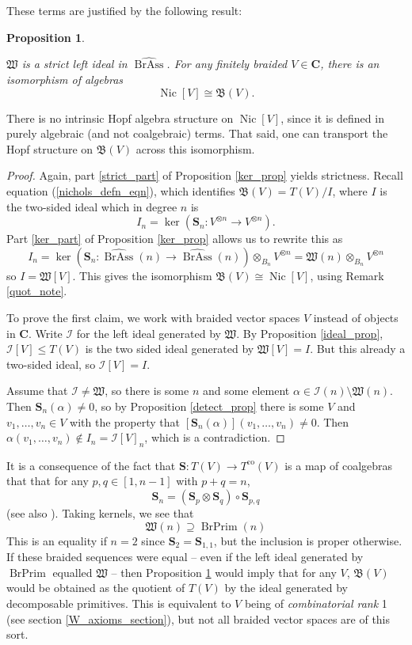 \documentclass[12pt]{article}
\DeclareMathOperator{\Nic}{Nic}
\DeclareMathOperator{\BrAss}{BrAss}
\DeclareMathOperator{\BrPrim}{BrPrim}
\DeclareMathOperator{\co}{co}
\newcommand{\BrAsshat}{\widehat{\BrAss}} %
\newcommand{\bC} {\mathbf{C}}
\newcommand{\bS} {\mathbf{S}}
\newcommand{\mB}{\mathfrak{B}}
\newcommand{\mW}{\mathfrak{W}}
\newcommand{\II}{\mathcal{I}}
\newcommand{\beqn}{\begin{equation}}
\newcommand{\eeqn}{\end{equation}}
\theoremstyle{plain}
\newtheorem{prop}[thm]{Proposition}
\theoremstyle{definition}
\theoremstyle{remark}
\begin{document}
These terms are justified by the following result:

\begin{prop} \label{nic_prop}

$\mW$ is a strict left ideal in $\BrAsshat$.  For any finitely braided $V \in \bC$, there is an isomorphism of algebras 
%
$$\Nic[V] \cong \mB(V).$$

\end{prop}

There is no intrinsic Hopf algebra structure on $\Nic[V]$, since it is defined in purely algebraic (and not coalgebraic) terms.  That said, one can transport the Hopf structure on $\mB(V)$ across this isomorphism.  

\begin{proof}

Again, part \ref{strict_part} of Proposition \ref{ker_prop} yields strictness.  Recall equation (\ref{nichols_defn_eqn}), which identifies $\mB(V) = T(V) /I$, where $I$ is the two-sided ideal which in degree $n$ is
%
$$I_n = \ker(\bS_n: V^{\otimes n} \to V^{\otimes n}).$$
%
Part \ref{ker_part} of Proposition \ref{ker_prop} allows us to rewrite this as
%
$$I_n =  \ker\left(\bS_n: \BrAsshat(n) \to \BrAsshat(n)\right) \otimes_{B_n} V^{\otimes n} = \mW(n) \otimes_{B_n} V^{\otimes n}$$
%
so $I = \mW[V]$.  This gives the isomorphism $\mB(V) \cong \Nic[V]$, using Remark \ref{quot_note}.

To prove the first claim, we work with braided vector spaces $V$ instead of objects in $\bC$.  Write $\II$ for the left ideal generated by $\mW$.  By Proposition \ref{ideal_prop}, $\II[V] \leq T(V)$ is the two sided ideal generated by $\mW[V] = I$.  But this already a two-sided ideal, so $\II[V] = I$.

Assume that $\II \neq \mW$, so there is some $n$ and some element $\alpha \in \II(n) \setminus \mW(n)$.  Then $\bS_n(\alpha) \neq 0$, so by Proposition \ref{detect_prop} there is some $V$ and $v_1, \dots, v_n \in V$ with the property that $[\bS_n(\alpha)](v_1, \dots, v_n) \neq 0$.  Then $\alpha(v_1, \dots, v_n) \notin I_n = \II[V]_n$, which is a contradiction.  

\end{proof} 

It is a consequence of the fact that $\bS: T(V) \to T^{\co}(V)$ is a map of coalgebras that that for any $p, q \in [1, n-1]$ with $p+q = n$, 
%
\beqn \bS_n = (\bS_p \otimes \bS_q) \circ \bS_{p,q} \label{sym_diag_eqn} \eeqn
%
(see also \cite{schauenburg}).  Taking kernels, we see that
%
\beqn \label{prim_inclusion_eqn} \mW(n) \supseteq \BrPrim(n) \eeqn
%
This is an equality if $n=2$ since $\bS_2 = \bS_{1,1}$, but the inclusion is proper otherwise.  If these braided sequences were equal -- even if the left ideal generated by $\BrPrim$ equalled $\mW$ -- then Proposition \ref{nic_prop} would imply that for any $V$, $\mB(V)$ would be obtained as the quotient of $T(V)$ by the ideal generated by decomposable primitives.  This is equivalent to $V$ being of \emph{combinatorial rank} 1 (see section \ref{W_axioms_section}), but not all braided vector spaces are of this sort.
\end{document}
